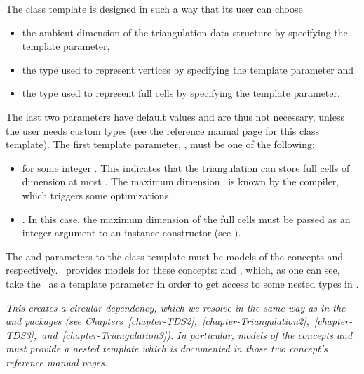 The 
class template is designed in such a way that its user can choose
\begin{itemize}
\item the ambient dimension of the triangulation data structure by specifying the  template parameter,
\item the type used to represent vertices by specifying the 
template parameter and
\item the type used to represent full cells by specifying the
 template parameter.
\end{itemize}

The last two parameters have default values and are thus not necessary, unless
the user needs custom types (see the reference manual page for this class
template). The first template parameter, , must be
one of the following:
\begin{itemize}
\item \ccPureGlobalScope{} for some integer \ad. This
indicates that the triangulation can store full cells of dimension at most
\ad. The maximum dimension \ad\ is known by the compiler, which
triggers some optimizations. 
\item \ccPureGlobalScope{}. In this case, the maximum
dimension of the full cells must be passed as an integer argument to an instance
constructor (see ).
\end{itemize}

The  and  parameters to the class template
must be models of the concepts  and
 respectively. \cgal\ provides models for these
concepts:  and
, which, as one
can see, take the \tds\ as a template parameter in order to get access to
some nested types in \tds.

\em{This creates a circular dependency}, which we resolve in the same way
as in the \cgal\  and  packages (see
Chapters~\ref{chapter-TDS2},~\ref{chapter-Triangulation2},~\ref{chapter-TDS3},~and~\ref{chapter-Triangulation3}).
In particular, models of the concepts  and
 must provide a nested template 
which is documented in those two concept's reference manual pages.

